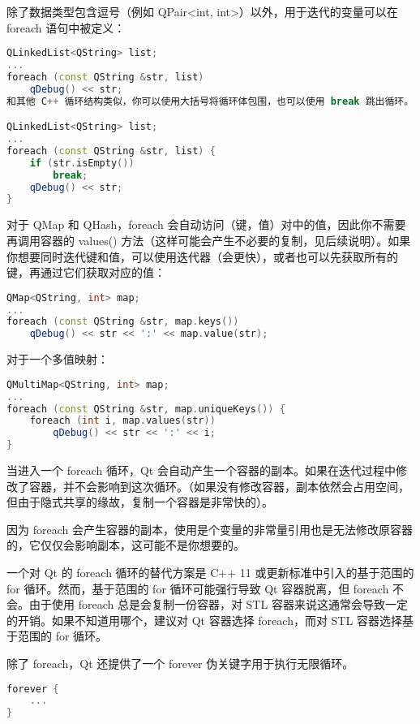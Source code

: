 除了数据类型包含逗号（例如 QPair<int, int>）以外，用于迭代的变量可以在 foreach 语句中被定义：

\begin{lstlisting}[language=C++]
QLinkedList<QString> list;
...
foreach (const QString &str, list)
    qDebug() << str;
和其他 C++ 循环结构类似，你可以使用大括号将循环体包围，也可以使用 break 跳出循环。

QLinkedList<QString> list;
...
foreach (const QString &str, list) {
    if (str.isEmpty())
        break;
    qDebug() << str;
}
\end{lstlisting}

对于 QMap 和 QHash，foreach 会自动访问（键，值）对中的值，因此你不需要再调用容器的 values() 方法（这样可能会产生不必要的复制，见后续说明）。如果你想要同时迭代键和值，可以使用迭代器（会更快），或者也可以先获取所有的键，再通过它们获取对应的值：

\begin{lstlisting}[language=C++]
QMap<QString, int> map;
...
foreach (const QString &str, map.keys())
    qDebug() << str << ':' << map.value(str);
\end{lstlisting}


对于一个多值映射：

\begin{lstlisting}[language=C++]
QMultiMap<QString, int> map;
...
foreach (const QString &str, map.uniqueKeys()) {
    foreach (int i, map.values(str))
        qDebug() << str << ':' << i;
}
\end{lstlisting}

当进入一个 foreach 循环，Qt 会自动产生一个容器的副本。如果在迭代过程中修改了容器，并不会影响到这次循环。（如果没有修改容器，副本依然会占用空间，但由于隐式共享的缘故，复制一个容器是非常快的）。

因为 foreach 会产生容器的副本，使用是个变量的非常量引用也是无法修改原容器的，它仅仅会影响副本，这可能不是你想要的。

一个对 Qt 的 foreach 循环的替代方案是 C++ 11 或更新标准中引入的基于范围的 for 循环。然而，基于范围的 for 循环可能强行导致 Qt 容器脱离，但 foreach 不会。由于使用 foreach 总是会复制一份容器，对 STL 容器来说这通常会导致一定的开销。如果不知道用哪个，建议对 Qt 容器选择 foreach，而对 STL 容器选择基于范围的 for 循环。

除了 foreach，Qt 还提供了一个 forever 伪关键字用于执行无限循环。

\begin{lstlisting}[language=C++]
forever {
    ...
}
\end{lstlisting}

